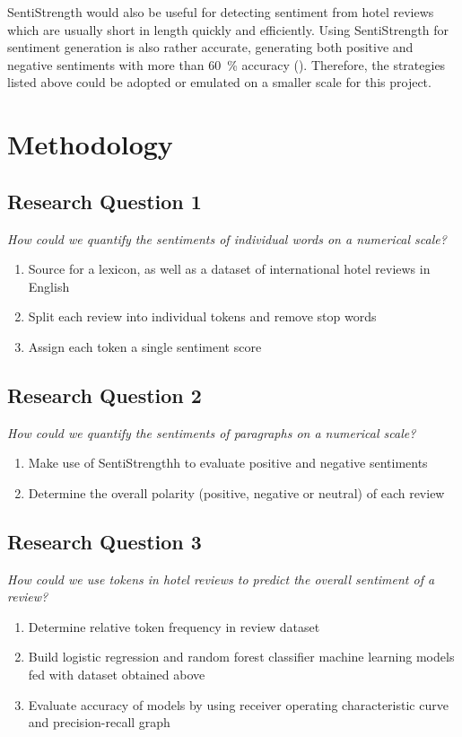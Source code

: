 \documentclass[
	fontsize=12pt,
	paper=a4,
	bibliography=totocnumbered
]{scrartcl}
\begin{document}
SentiStrength would also be useful for
detecting sentiment from hotel reviews which are usually short in length quickly
and efficiently. Using SentiStrength for sentiment generation is also
rather accurate, generating both positive and negative sentiments with more
than \qty{60}{\percent} accuracy (\cite{thelwall}). Therefore, the strategies listed
above could be adopted or emulated on a smaller scale for this project.

\section{Methodology}
\subsection{Research Question 1}
\textit{How could we quantify the sentiments of individual words on a numerical scale?}

\begin{enumerate}
	\item Source for a lexicon, as well as a dataset of international hotel reviews in English
	\item Split each review into individual tokens and remove stop words
	\item Assign each token a single sentiment score
\end{enumerate}

\subsection{Research Question 2}
\textit{How could we quantify the sentiments of paragraphs on a numerical scale?}
\begin{enumerate}
	\item Make use of SentiStrengthh to evaluate positive and negative sentiments
	\item Determine the overall polarity (positive, negative or neutral) of each review
\end{enumerate}

\subsection{Research Question 3}
\textit{How could we use tokens in hotel reviews to predict the overall sentiment of a review?}
\begin{enumerate}
	\item Determine relative token frequency in review dataset
	\item Build logistic regression and random forest classifier machine learning models 
		fed with dataset obtained above
	\item Evaluate accuracy of models by using receiver operating characteristic curve and precision-recall graph 
\end{enumerate}


\printbibliography
\end{document}
